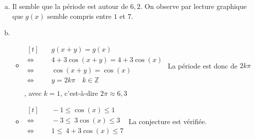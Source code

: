 \documentclass[12pt, a4paper]{article}
\begin{document}
\begin{Exercise}[number={88}]
    \begin{enumerate}[a)]
        \item Il semble que la période est autour de $6{,}2$. On observe par lecture graphique que $g(x)$ semble compris entre $1$ et $7$.
        \item   \begin{itemize}
                    \item[] $\begin{aligned}[t]
                                &\quad g(x+y)=g(x) \\
                                \iff&\quad 4+3\cos(x+y)=4+3\cos(x) \\
                                \iff&\quad \cos(x+y)=\cos(x) \\
                                \iff&\quad y=2k\pi\quad k\in\mathbb{Z} \\
                            \end{aligned}$ \smallbreak
                            La période est donc de $2k\pi$, avec $k=1$, c'est-à-dire $2\pi\approx 6{,}3$ \medbreak
                    \item[] $\begin{aligned}[t]
                                &\quad -1\leq\cos(x)\leq 1 \\
                                \iff&\quad -3\leq\ 3\cos(x)\leq 3 \\
                                \iff&\quad 1\leq\ 4+3\cos(x)\leq 7 \\
                            \end{aligned}$ \smallbreak
                            La conjecture est vérifiée. \medbreak
                \end{itemize}
    \end{enumerate}
\end{Exercise}
\end{document}

